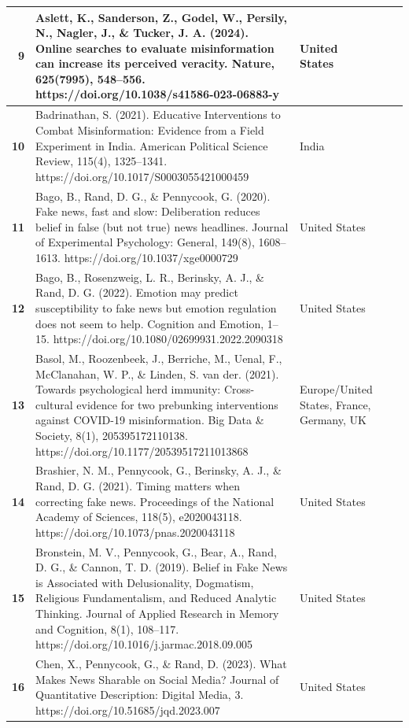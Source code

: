 \documentclass[
  man]{apa6}
\begin{document}
\begin{longtable}[t]{>{}r||>{\raggedright\arraybackslash}p{20em}|>{\raggedright\arraybackslash}p{7em}|>{\raggedleft\arraybackslash}p{5em}|>{\raggedleft\arraybackslash}p{5em}}
\hline
\textbf{9} & Aslett, K., Sanderson, Z., Godel, W., Persily, N., Nagler, J., \& Tucker, J. A. (2024). Online searches to evaluate misinformation can increase its perceived veracity. Nature, 625(7995), 548–556. https://doi.org/10.1038/s41586-023-06883-y & United States & 5 & 7838\\
\hline
\textbf{10} & Badrinathan, S. (2021). Educative Interventions to Combat Misinformation: Evidence from a Field Experiment in India. American Political Science Review, 115(4), 1325–1341. https://doi.org/10.1017/S0003055421000459 & India & 2 & 406\\
\hline
\textbf{11} & Bago, B., Rand, D. G., \& Pennycook, G. (2020). Fake news, fast and slow: Deliberation reduces belief in false (but not true) news headlines. Journal of Experimental Psychology: General, 149(8), 1608–1613. https://doi.org/10.1037/xge0000729 & United States & 3 & 561\\
\hline
\textbf{12} & Bago, B., Rosenzweig, L. R., Berinsky, A. J., \& Rand, D. G. (2022). Emotion may predict susceptibility to fake news but emotion regulation does not seem to help. Cognition and Emotion, 1–15. https://doi.org/10.1080/02699931.2022.2090318 & United States & 8 & 4347\\
\hline
\textbf{13} & Basol, M., Roozenbeek, J., Berriche, M., Uenal, F., McClanahan, W. P., \& Linden, S. van der. (2021). Towards psychological herd immunity: Cross-cultural evidence for two prebunking interventions against COVID-19 misinformation. Big Data \& Society, 8(1), 205395172110138. https://doi.org/10.1177/20539517211013868 & Europe/United States, France, Germany, UK & 11 & 3548\\
\hline
\textbf{14} & Brashier, N. M., Pennycook, G., Berinsky, A. J., \& Rand, D. G. (2021). Timing matters when correcting fake news. Proceedings of the National Academy of Sciences, 118(5), e2020043118. https://doi.org/10.1073/pnas.2020043118 & United States & 2 & 812\\
\hline
\textbf{15} & Bronstein, M. V., Pennycook, G., Bear, A., Rand, D. G., \& Cannon, T. D. (2019). Belief in Fake News is Associated with Delusionality, Dogmatism, Religious Fundamentalism, and Reduced Analytic Thinking. Journal of Applied Research in Memory and Cognition, 8(1), 108–117. https://doi.org/10.1016/j.jarmac.2018.09.005 & United States & 2 & 948\\
\hline
\textbf{16} & Chen, X., Pennycook, G., \& Rand, D. (2023). What Makes News Sharable on Social Media? Journal of Quantitative Description: Digital Media, 3. https://doi.org/10.51685/jqd.2023.007 & United States & 2 & 5000\\

\end{longtable}
\end{document}
